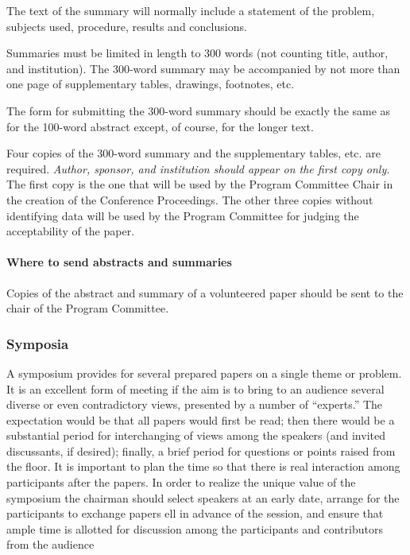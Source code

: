 The text of the summary will normally include a statement of the problem, subjects used, procedure, results and conclusions.

Summaries must be limited in length to 300 words (not counting title, author, and institution). The 300-word summary may be accompanied by not more than one page of supplementary tables, drawings, footnotes, etc.

The form for submitting the 300-word summary should be exactly the same as for the 100-word abstract except, of course, for the longer text.

Four copies of the 300-word summary and the supplementary tables, etc. are required. \emph{Author, sponsor, and institution should appear on the first copy only.} The first copy is the one that will be used by the Program Committee Chair in the creation of the Conference Proceedings. The other three copies without identifying data will be used by the Program Committee for judging the acceptability of the paper.

\paragraph{Where to send abstracts and summaries}
\label{wheretosendabstractsandsummaries}

Copies of the abstract and summary of a volunteered paper should be sent to the chair of the Program Committee.

\subsubsection{Symposia}
\label{symposia}

A symposium provides for several prepared papers on a single theme or problem. It is an excellent form of meeting if the aim is to bring to an audience several diverse or even contradictory views, presented by a number of “experts.” The expectation would be that all papers would first be read; then there would be a substantial period for interchanging of views among the speakers (and invited discussants, if desired); finally, a brief period for questions or points raised from the floor. It is important to plan the time so that there is real interaction among participants after the papers. In order to realize the unique value of the symposium the chairman should select speakers at an early date, arrange for the participants to exchange papers ell in advance of the session, and ensure that ample time is allotted for discussion among the participants and contributors from the audience

